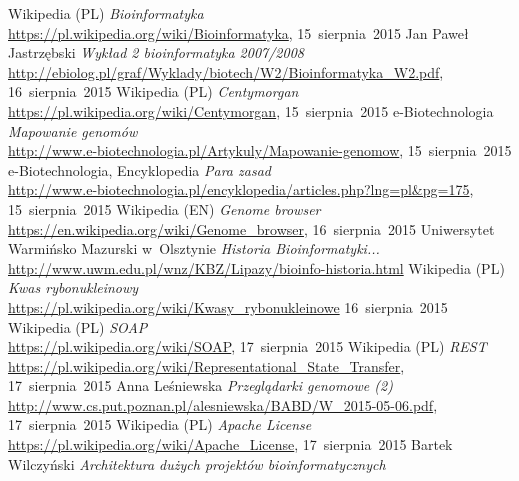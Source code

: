 \documentclass[a4paper,12pt,oneside]{mwrep}  %
\begin{document}
\begin{thebibliography}{99}
 Wikipedia (PL) \emph{Bioinformatyka}\\ \url{https://pl.wikipedia.org/wiki/Bioinformatyka}, \mbox{15~sierpnia~2015}
Jan Paweł Jastrzębski \emph{Wykład 2 bioinformatyka 2007/2008}\\
\url{http://ebiolog.pl/graf/Wyklady/biotech/W2/Bioinformatyka_W2.pdf}, \mbox{16~sierpnia~2015}
 Wikipedia (PL) \emph{Centymorgan}\\ \url{https://pl.wikipedia.org/wiki/Centymorgan}, \mbox{15~sierpnia~2015}
 e-Biotechnologia \emph{Mapowanie genomów}\\ \url{http://www.e-biotechnologia.pl/Artykuly/Mapowanie-genomow}, \mbox{15~sierpnia~2015}
 e-Biotechnologia, Encyklopedia \emph{Para zasad}\\ \url{http://www.e-biotechnologia.pl/encyklopedia/articles.php?lng=pl&pg=175}, \mbox{15~sierpnia~2015}
 Wikipedia (EN) \emph{Genome browser}\\ \url{https://en.wikipedia.org/wiki/Genome_browser}, \mbox{16~sierpnia~2015}
 Uniwersytet Warmińsko Mazurski w~Olsztynie \emph{Historia Bioinformatyki...}\\ \url{http://www.uwm.edu.pl/wnz/KBZ/Lipazy/bioinfo-historia.html}
 Wikipedia (PL) \emph{Kwas rybonukleinowy}\\
\url{https://pl.wikipedia.org/wiki/Kwasy_rybonukleinowe} \mbox{16~sierpnia~2015}
 Wikipedia (PL) \emph{SOAP}\\
\url{https://pl.wikipedia.org/wiki/SOAP}, \mbox{17~sierpnia~2015}
 Wikipedia (PL) \emph{REST}\\
\url{https://pl.wikipedia.org/wiki/Representational_State_Transfer}, \mbox{17~sierpnia~2015}
 Anna Leśniewska \emph{Przeglądarki genomowe (2)}\\
\url{http://www.cs.put.poznan.pl/alesniewska/BABD/W_2015-05-06.pdf}, \mbox{17~sierpnia~2015}
 Wikipedia (PL) \emph{Apache License}\\ \url{https://pl.wikipedia.org/wiki/Apache_License}, \mbox{17~sierpnia~2015}		
 Bartek Wilczyński \emph{Architektura dużych projektów bioinformatycznych}\\

\end{thebibliography}
\end{document}

